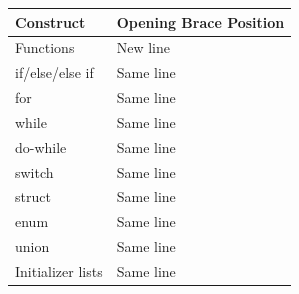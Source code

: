 \begin{center}
\begin{tabular}{|l|l|}
\hline
\textbf{Construct} & \textbf{Opening Brace Position} \\
\hline
Functions & New line \\
\hline
if/else/else if & Same line \\
\hline
for & Same line \\
\hline
while & Same line \\
\hline
do-while & Same line \\
\hline
switch & Same line \\
\hline
struct & Same line \\
\hline
enum & Same line \\
\hline
union & Same line \\
\hline
Initializer lists & Same line \\
\hline
\end{tabular}
\end{center}

